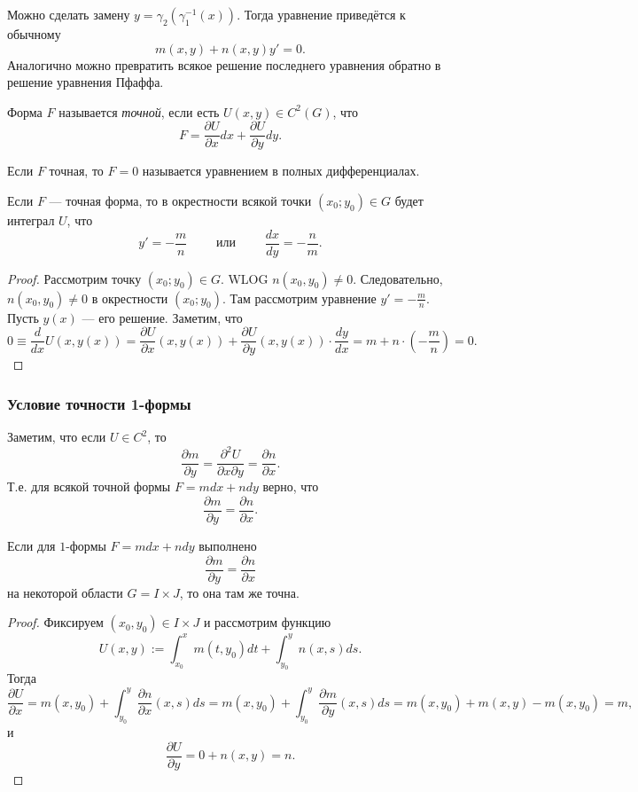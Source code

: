 \documentclass[12pt,a4paper]{article}
\begin{document}
    Можно сделать замену $y = \gamma_2(\gamma_1^{-1}(x))$. Тогда уравнение приведётся к обычному
    \[m(x, y) + n(x, y) y' = 0.\]
    Аналогично можно превратить всякое решение последнего уравнения обратно в решение уравнения Пфаффа.

    Форма $F$ называется \emph{точной}, если есть $U(x, y) \in C^2(G)$, что
    \[F = \frac{\partial U}{\partial x} dx + \frac{\partial U}{\partial y} dy.\]

    Если $F$ точная, то $F = 0$ называется уравнением в полных дифференциалах.

    \begin{theorem}
        Если $F$ --- точная форма, то в окрестности всякой точки $(x_0; y_0) \in G$ будет интеграл $U$, что
        \[y' = - \frac{m}{n} \qquad \text{ или } \qquad \frac{dx}{dy} = - \frac{n}{m}.\]
    \end{theorem}

    \begin{proof}
        Рассмотрим точку $(x_0; y_0) \in G$. WLOG $n(x_0, y_0) \neq 0$. Следовательно, $n(x_0, y_0) \neq 0$ в окрестности $(x_0; y_0)$. Там рассмотрим уравнение $y' = - \frac{m}{n}$. Пусть $y(x)$ --- его решение. Заметим, что
        \[
            0
            \equiv \frac{d}{dx} U(x, y(x))
            = \frac{\partial U}{\partial x}(x, y(x)) + \frac{\partial U}{\partial y}(x, y(x)) \cdot \frac{dy}{dx}
            = m + n \cdot \left(- \frac{m}{n}\right)
            = 0.
        \]
    \end{proof}

    \subsubsection{Условие точности 1-формы}

    Заметим, что если $U \in C^2$, то
    \[\frac{\partial m}{\partial y} = \frac{\partial^2 U}{\partial x \partial y} = \frac{\partial n}{\partial x}.\]
    Т.е. для всякой точной формы $F = m dx + n dy$ верно, что
    \[\frac{\partial m}{\partial y} = \frac{\partial n}{\partial x}.\]

    \begin{theorem}
        Если для $1$-формы $F = m dx + n dy$ выполнено
        \[\frac{\partial m}{\partial y} = \frac{\partial n}{\partial x}\]
        на некоторой области $G = I \times J$, то она там же точна.
    \end{theorem}

    \begin{proof}
        Фиксируем $(x_0, y_0) \in I \times J$ и рассмотрим функцию
        \[U(x, y) := \int_{x_0}^x m(t, y_0) dt + \int_{y_0}^y n(x, s) ds.\]
        Тогда
        \[
            \frac{\partial U}{\partial x}
            = m(x, y_0) + \int_{y_0}^y \frac{\partial n}{\partial x}(x, s) ds
            = m(x, y_0) + \int_{y_0}^y \frac{\partial m}{\partial y}(x, s) ds
            = m(x, y_0) + m(x, y) - m(x, y_0)
            = m,
        \]
        и
        \[
            \frac{\partial U}{\partial y}
            = 0 + n(x, y)
            = n.
        \]
    \end{proof}
\end{document}
